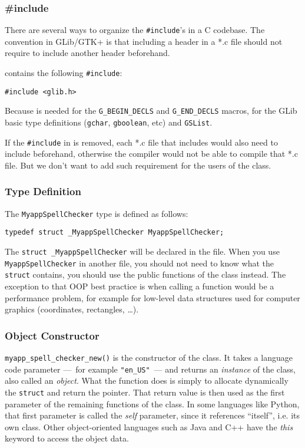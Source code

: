 \subsubsection{\#include}
\label{oop-include-in-header}
There are several ways to organize the \lstinline{#include}'s in a C codebase. The convention in GLib/GTK+ is that including a header in a *.c file should not require to include another header beforehand.

 contains the following \lstinline{#include}:
\begin{lstlisting}
#include <glib.h>
\end{lstlisting}

Because  is needed for the \lstinline{G_BEGIN_DECLS} and \lstinline{G_END_DECLS} macros, for the GLib basic type definitions (\lstinline{gchar}, \lstinline{gboolean}, etc) and \lstinline{GSList}.

If the \lstinline{#include} in  is removed, each *.c file that includes  would also need to include  beforehand, otherwise the compiler would not be able to compile that *.c file. But we don't want to add such requirement for the users of the class.

\subsubsection{Type Definition}
The \lstinline{MyappSpellChecker} type is defined as follows:

\begin{lstlisting}
typedef struct _MyappSpellChecker MyappSpellChecker;
\end{lstlisting}

The \lstinline{struct _MyappSpellChecker} will be declared in the  file. When you use \lstinline{MyappSpellChecker} in another file, you should not need to know what the \lstinline{struct} contains, you should use the public functions of the class instead. The exception to that OOP best practice is when calling a function would be a performance problem, for example for low-level data structures used for computer graphics (coordinates, rectangles, …).

\subsubsection{Object Constructor}
\lstinline{myapp_spell_checker_new()} is the constructor of the class. It takes a language code parameter ---~for example \lstinline{"en_US"}~--- and returns an \emph{instance} of the class, also called an \emph{object}. What the function does is simply to allocate dynamically the \lstinline{struct} and return the pointer. That return value is then used as the first parameter of the remaining functions of the class. In some languages like Python, that first parameter is called the \emph{self} parameter, since it references ``itself'', i.e. its own class. Other object-oriented languages such as Java and C++ have the \emph{this} keyword to access the object data.

